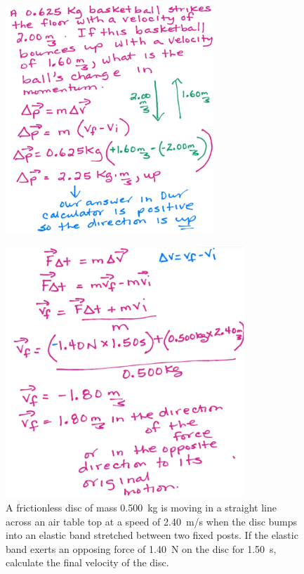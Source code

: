 \documentclass[a4paper,12pt]{article}
\begin{document}
\begin{figure}[H]
    \centering
    \includegraphics[width=0.7\textwidth]{q-imp}
\end{figure}
\begin{figure}[H]
    \centering
    \caption{A frictionless disc of mass \SI{0.500}{\kg} is moving in a straight line across an air table top at a speed of \SI{2.40}{\m/\s} when the disc bumps into an elastic band stretched between two fixed posts. If the elastic band exerts an opposing force of \SI{1.40}{\N} on the disc for \SI{1.50}{\s}, calculate the final velocity of the disc.}
    \includegraphics[width=0.8\textwidth]{q-imp-2}
\end{figure}
\end{document}
